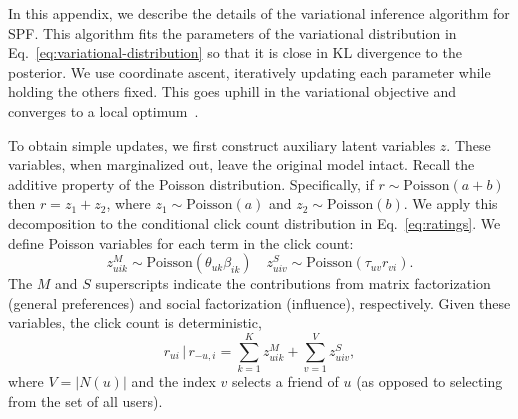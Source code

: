 \documentclass{sig-alternate-2013}
\begin{document}
\normalsize

\appendix
\label{app:inference}
In this appendix, we describe the details of the variational inference
algorithm for SPF.  This algorithm fits the parameters of the
variational distribution in Eq.~\ref{eq:variational-distribution}
so that it is close in KL divergence to the posterior.  We use
coordinate ascent, iteratively updating each parameter while holding
the others fixed.  This goes uphill in the variational objective and
converges to a local optimum~\cite{Bishop:2006}.

To obtain simple updates, we first construct auxiliary latent
variables $z$.  These variables, when marginalized out, leave the
original model intact.  Recall the additive property of the Poisson
distribution.  Specifically, if $r \sim \mbox{Poisson}(a+b)$ then
$r = z_1 + z_2$, where $z_1 \sim \mbox{Poisson}(a)$ and
$z_2 \sim \mbox{Poisson}(b)$.  We apply this decomposition to the
conditional click count distribution in Eq.~\ref{eq:ratings}.  We
define Poisson variables for each term in the click count:
\begin{equation*}
  z^M_{uik} \sim \mbox{Poisson}(\theta_{uk}\beta_{ik}) \quad
  z^S_{uiv} \sim \mbox{Poisson}\left(\tau_{uv} r_{vi}\right).
\end{equation*}
The $M$ and $S$ superscripts indicate the contributions from matrix
factorization (general preferences) and social factorization
(influence), respectively.  Given these variables, the click count is
deterministic,
\begin{equation*}
  r_{ui} \, \vert \, r_{-u,i} = \textstyle \sum_{k=1}^K z^M_{uik} + \sum_{v=1}^V
  z^S_{uiv},
\end{equation*}
where $V=\vert N(u) \vert$ and the index $v$ selects a friend of $u$
(as opposed to selecting from the set of all users).
\end{document}
